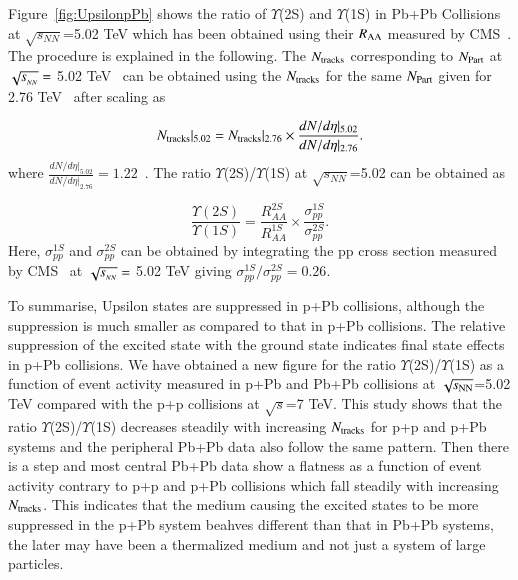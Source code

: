 Figure~\ref{fig:UpsilonpPb} shows the ratio of $\Upsilon$(2S)
and $\Upsilon$(1S) in Pb+Pb Collisions at
$\sqrt{s_{NN}}$=5.02 TeV which has been obtained using their $R_{\rm AA}$ measured by
CMS~\cite{CMS:2022wfi}. The procedure is explained in the following.
The $N_{\rm tracks}$ corresponding to $N_{\rm Part}$ at $\sqrt{s_{_{NN}}} =$ 5.02 TeV~\cite{CMS:2018zza}
can be obtained using the $N_{\rm tracks}$ for the same $N_{\rm Part}$ given
for 2.76 TeV~\cite{CMS:2013jsu} after scaling as

\begin{equation}
N_{\rm tracks}|_{5.02} =  N_{\rm tracks}|_{2.76} \times \frac{dN/d\eta |_{5.02}} {dN/d\eta|_{2.76}}.
\end{equation}
where $\frac{dN/d\eta |_{5.02}} {dN/d\eta|_{2.76}}=1.22$~\cite{CMS:2018zza,CMS:2013jsu}.
The ratio $\Upsilon$(2S)/$\Upsilon$(1S) at $\sqrt{s_{NN}}$=5.02 can be obtained as 

\begin{equation}
\frac{\Upsilon(2S)}{\Upsilon(1S)} = \frac{R_{AA}^{2S}}{R_{AA}^{1S}} \times \frac{\sigma_{pp}^{1S}}{\sigma_{pp}^{2S}}.
\end{equation}
Here, $\sigma_{pp}^{1S}$ and $\sigma_{pp}^{2S}$ can be obtained by integrating the pp cross section
measured by CMS~\cite{CMS:2013jsu} at $\sqrt{s_{_{NN}}} =$ 5.02 TeV giving $\sigma_{pp}^{1S}/\sigma_{pp}^{2S}=0.26$.

To summarise, Upsilon states are suppressed in p+Pb collisions, although
the suppression is much smaller as compared to that in p+Pb collisions.
The relative suppression of the excited state with the ground state indicates final
state effects in p+Pb collisions. 
We have obtained a new figure for the ratio $\Upsilon$(2S)/$\Upsilon$(1S)
as a function of event activity measured in p+Pb and Pb+Pb collisions at
$\sqrt{s_{\rm NN}}$=5.02 TeV compared with the 
p+p collisions at $\sqrt{s}$=7 TeV. This study shows 
that the ratio $\Upsilon$(2S)/$\Upsilon$(1S) decreases steadily
with increasing $N_{\rm tracks}$ for
p+p and p+Pb systems and the peripheral Pb+Pb data also follow the same pattern.
Then there is a step and most central Pb+Pb
data show a flatness as a function of event activity contrary to p+p and
p+Pb collisions which fall steadily with increasing $N_{\rm tracks}$.
This indicates that the medium causing the excited states to be more suppressed
in the p+Pb system beahves different than that in Pb+Pb systems, the later may have
been a thermalized medium and not just a system of large particles.



  

